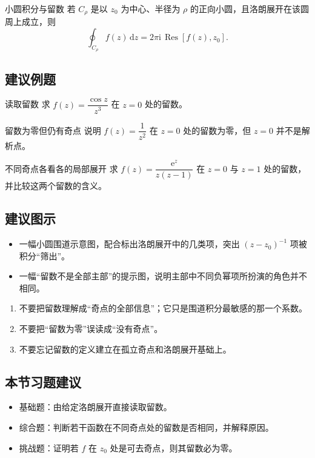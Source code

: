 \begin{tuilun}{小圆积分与留数}{}
若 $C_\rho$ 是以 $z_0$ 为中心、半径为 $\rho$ 的正向小圆，且洛朗展开在该圆周上成立，则
\[
    \oint_{C_\rho} f(z)\,\mathrm{d}z = 2\pi \mathrm{i}\,\operatorname{Res}[f(z),z_0].
\]
\end{tuilun}

\subsection*{建议例题}
\begin{lizi}{读取留数}{}
求 $f(z)=\dfrac{\cos z}{z^3}$ 在 $z=0$ 处的留数。
\end{lizi}

\begin{lizi}{留数为零但仍有奇点}{}
说明 $f(z)=\dfrac{1}{z^2}$ 在 $z=0$ 处的留数为零，但 $z=0$ 并不是解析点。
\end{lizi}

\begin{lizi}{不同奇点各看各的局部展开}{}
求 $f(z)=\dfrac{\mathrm{e}^z}{z(z-1)}$ 在 $z=0$ 与 $z=1$ 处的留数，并比较这两个留数的含义。
\end{lizi}

\subsection*{建议图示}
\begin{itemize}
    \item 一幅小圆围道示意图，配合标出洛朗展开中的几类项，突出 $(z-z_0)^{-1}$ 项被积分``筛出''。
    \item 一幅``留数不是全部主部''的提示图，说明主部中不同负幂项所扮演的角色并不相同。
\end{itemize}

\begin{jinshi}[本节易错点]
\begin{enumerate}
    \item 不要把留数理解成``奇点的全部信息''；它只是围道积分最敏感的那一个系数。
    \item 不要把``留数为零''误读成``没有奇点''。
    \item 不要忘记留数的定义建立在孤立奇点和洛朗展开基础上。
\end{enumerate}
\end{jinshi}

\subsection*{本节习题建议}
\begin{itemize}
    \item 基础题：由给定洛朗展开直接读取留数。
    \item 综合题：判断若干函数在不同奇点处的留数是否相同，并解释原因。
    \item 挑战题：证明若 $f$ 在 $z_0$ 处是可去奇点，则其留数必为零。
\end{itemize}

